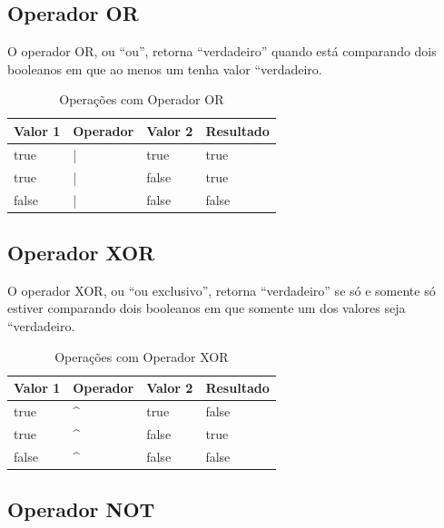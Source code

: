 \documentclass[
]{book}
\begin{document}
\hypertarget{operador-or}{%
\subsection{Operador OR}\label{operador-or}}

O operador OR, ou ``ou'', retorna ``verdadeiro'' quando está comparando dois booleanos em que ao menos um tenha valor ``verdadeiro.

\begin{table}

\caption{\label{tab:unnamed-chunk-10}Operações com Operador OR}
\centering
\begin{tabular}[t]{l|l|l|l}
\hline
Valor 1 & Operador & Valor 2 & Resultado\\
\hline
true & | & true & true\\
\hline
true & | & false & true\\
\hline
false & | & false & false\\
\hline
\end{tabular}
\end{table}

\hypertarget{operador-xor}{%
\subsection{Operador XOR}\label{operador-xor}}

O operador XOR, ou ``ou exclusivo'', retorna ``verdadeiro'' se só e somente só estiver comparando dois booleanos em que somente um dos valores seja ``verdadeiro.

\begin{table}

\caption{\label{tab:unnamed-chunk-11}Operações com Operador XOR}
\centering
\begin{tabular}[t]{l|l|l|l}
\hline
Valor 1 & Operador & Valor 2 & Resultado\\
\hline
true & \textasciicircum{} & true & false\\
\hline
true & \textasciicircum{} & false & true\\
\hline
false & \textasciicircum{} & false & false\\
\hline
\end{tabular}
\end{table}

\hypertarget{operador-not}{%
\subsection{Operador NOT}\label{operador-not}}
\end{document}
